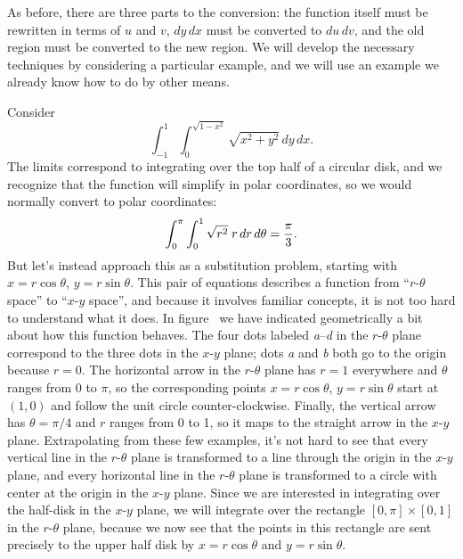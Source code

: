As before, there are three parts to the conversion: the function
itself must be rewritten in terms of $u$ and $v$, $dy\,dx$ must be
converted to $du\,dv$, and the old region must be converted to the new
region. We will develop the necessary techniques by considering a
particular example, and we will use an example we already know how to
do by other means.

Consider 
$$\int_{-1}^1\int_0^{\sqrt{1-x^2}} \sqrt{x^2+y^2}\,dy\,dx.$$
The limits correspond to integrating over the top half of a circular
disk, and we recognize that the function will simplify in polar
coordinates, so we would normally convert to polar coordinates:
$$\int_{0}^\pi\int_0^1 \sqrt{r^2}\;r\,dr\,d\theta={\pi\over3}.$$
But let's instead approach this as a substitution problem, starting
with $x=r\cos\theta$, $y=r\sin\theta$. This pair of equations
describes a function from ``$r$-$\theta$ space'' to ``$x$-$y$ space'',
and because it involves familiar concepts, it is not too hard to
understand what it does. In figure~ we have indicated geometrically a bit about how this
function behaves. The four dots labeled {\em a}--{\em d} in the $r$-$\theta$ plane
correspond to the three dots in the $x$-$y$ plane; dots {\em a} and 
{\em b} both
go to the origin because $r=0$. The horizontal arrow in the
$r$-$\theta$ plane has $r=1$ everywhere and $\theta$ ranges from 0 to
$\pi$, so the corresponding points 
$x=r\cos\theta$, $y=r\sin\theta$ start at $(1,0)$ and follow the unit
circle counter-clockwise. Finally, the vertical arrow has
$\theta=\pi/4$ and $r$ ranges from 0 to 1, so it maps to the straight
arrow in the $x$-$y$ plane. Extrapolating from these few examples,
it's not hard to see that every vertical line in the $r$-$\theta$ plane
is transformed to a line through the origin in the $x$-$y$ plane, and
every horizontal line in the $r$-$\theta$ plane
is transformed to a circle with center at the origin in the $x$-$y$
plane. Since we are interested in integrating over the half-disk in
the $x$-$y$ plane, we will integrate over the rectangle
$[0,\pi]\times[0,1]$ in the $r$-$\theta$ plane, because we now see
that the points in this rectangle are sent precisely to the upper half
disk by $x=r\cos\theta$ and $y=r\sin\theta$.


